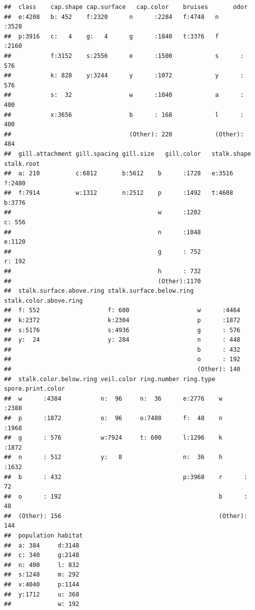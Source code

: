 \documentclass[
]{article}
\begin{document}
\begin{verbatim}
##  class    cap.shape cap.surface   cap.color    bruises       odor     
##  e:4208   b: 452    f:2320      n      :2284   f:4748   n      :3528  
##  p:3916   c:   4    g:   4      g      :1840   t:3376   f      :2160  
##           f:3152    s:2556      e      :1500            s      : 576  
##           k: 828    y:3244      y      :1072            y      : 576  
##           s:  32                w      :1040            a      : 400  
##           x:3656                b      : 168            l      : 400  
##                                 (Other): 220            (Other): 484  
##  gill.attachment gill.spacing gill.size   gill.color   stalk.shape stalk.root
##  a: 210          c:6812       b:5612    b      :1728   e:3516      ?:2480    
##  f:7914          w:1312       n:2512    p      :1492   t:4608      b:3776    
##                                         w      :1202               c: 556    
##                                         n      :1048               e:1120    
##                                         g      : 752               r: 192    
##                                         h      : 732                         
##                                         (Other):1170                         
##  stalk.surface.above.ring stalk.surface.below.ring stalk.color.above.ring
##  f: 552                   f: 600                   w      :4464          
##  k:2372                   k:2304                   p      :1872          
##  s:5176                   s:4936                   g      : 576          
##  y:  24                   y: 284                   n      : 448          
##                                                    b      : 432          
##                                                    o      : 192          
##                                                    (Other): 140          
##  stalk.color.below.ring veil.color ring.number ring.type spore.print.color
##  w      :4384           n:  96     n:  36      e:2776    w      :2388     
##  p      :1872           o:  96     o:7488      f:  48    n      :1968     
##  g      : 576           w:7924     t: 600      l:1296    k      :1872     
##  n      : 512           y:   8                 n:  36    h      :1632     
##  b      : 432                                  p:3968    r      :  72     
##  o      : 192                                            b      :  48     
##  (Other): 156                                            (Other): 144     
##  population habitat 
##  a: 384     d:3148  
##  c: 340     g:2148  
##  n: 400     l: 832  
##  s:1248     m: 292  
##  v:4040     p:1144  
##  y:1712     u: 368  
##             w: 192
\end{verbatim}
\end{document}
